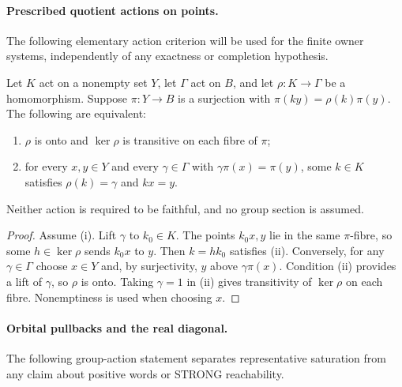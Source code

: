 \paragraph{Prescribed quotient actions on points.}
The following elementary action criterion will be used for the finite
owner systems, independently of any exactness or completion hypothesis.

\begin{lemma}
\label{lem:prescribed-action-point-lifting}
Let $K$ act on a nonempty set $Y$, let $\Gamma$ act on $B$, and
let $\rho:K\to\Gamma$ be a homomorphism. Suppose $\pi:Y\to B$
is a surjection with $\pi(ky)=\rho(k)\pi(y)$. The following are
equivalent:
\begin{enumerate}[label=(\roman*)]
\item $\rho$ is onto and $\ker\rho$ is transitive on each fibre
      of $\pi$;
\item for every $x,y\in Y$ and every $\gamma\in\Gamma$ with
      $\gamma\pi(x)=\pi(y)$, some $k\in K$ satisfies
      $\rho(k)=\gamma$ and $kx=y$.
\end{enumerate}
Neither action is required to be faithful, and no group section is
assumed.
\end{lemma}
\begin{proof}
Assume (i). Lift $\gamma$ to $k_0\in K$. The points $k_0x,y$
lie in the same $\pi$-fibre, so some $h\in\ker\rho$ sends
$k_0x$ to $y$. Then $k=hk_0$ satisfies (ii).
Conversely, for any $\gamma\in\Gamma$ choose $x\in Y$ and,
by surjectivity, $y$ above $\gamma\pi(x)$. Condition (ii)
provides a lift of $\gamma$, so $\rho$ is onto. Taking
$\gamma=1$ in (ii) gives transitivity of $\ker\rho$ on each
fibre. Nonemptiness is used when choosing $x$.
\end{proof}

\paragraph{Orbital pullbacks and the real diagonal.}
The following group-action statement separates representative saturation
from any claim about positive words or STRONG reachability.

